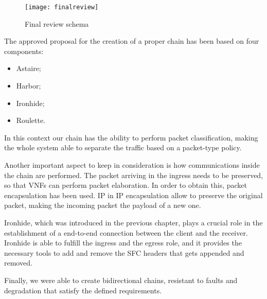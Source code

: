 \begin{figure}[t]
  \centering
  \texttt{[image: finalreview]}
  \caption{Final review schema}
  \label{chap:impl:img:finalreview}
\end{figure}

The approved proposal for the creation of a proper chain has been based on four components:
\begin{itemize}
\item Astaire;
\item Harbor;
\item Ironhide;
\item Roulette.
\end{itemize}

In this context our chain has the ability to perform packet classification,
making the whole system able to separate the traffic based on a packet-type
policy. 

Another important aspect to keep in consideration is how communications inside
the chain are performed. The packet arriving in the ingress needs to be
preserved, so that VNFs can perform packet elaboration. In order to obtain this,
packet encapsulation has been used. IP in IP encapsulation allow to preserve the
original packet, making the incoming packet the payload of a new one.

Ironhide, which was introduced in the previous chapter, plays a crucial role in
the establishment of a end-to-end connection between the client and the
receiver. Ironhide is able to fulfill the ingress and the egress role, and it
provides the necessary tools to add and remove the SFC headers that gets appended
and removed.

Finally, we were able to create bidirectional chains, resistant to faults and
degradation that satisfy the defined requirements.
